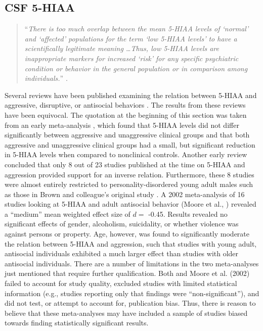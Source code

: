 \subsection{CSF 5-HIAA}
\begin{quotation}\noindent 
``\emph{There is too much overlap between the mean 5-HIAA levels of `normal' and `affected' populations for the term `low 5-HIAA levels' to have a scientifically legitimate meaning \ldots Thus, low 5-HIAA levels are inappropriate markers for increased `risk' for any specific psychiatric condition or behavior in the general population or in comparison among individuals.}'' 
\parencite[][29]{Balaban1996}.\end{quotation}


Several reviews have been published examining the relation between 5-HIAA and aggressive, disruptive, or antisocial behaviors \parencite[e.g.,][]{Asberg94, Balaban1996, Moore2002, Tuinier96, Tuinier95}. The results from these reviews have been equivocal. The quotation at the beginning of this section was taken from an early meta-analysis \parencite{Balaban1996}, which found that 5-HIAA levels did not differ significantly between aggressive and unaggressive clinical groups and that both aggressive and unaggressive clinical groups had a small, but significant reduction in 5-HIAA levels when compared to nonclinical controls. Another early review \parencite{Tuinier96} concluded that only 8 out of 23 studies published at the time on 5-HIAA and aggression provided support for an inverse relation. Furthermore, these 8 studies were almost entirely restricted to personality-disordered young adult males such as those in Brown and colleague's original study \parencite{Brown79}. A 2002 meta-analysis of 16 studies looking at 5-HIAA and adult antisocial behavior (Moore et al., \citeyear{Moore2002}) revealed a  ``medium'' \parencite[][p. 157]{Cohen88} mean weighted effect size of $d =$ -0.45. Results revealed no significant effects of gender, alcoholism, suicidality, or whether violence was against persons or property. Age, however, was found to significantly moderate the relation between 5-HIAA and aggression, such that studies with young adult, antisocial individuals exhibited a much larger effect than studies with older antisocial individuals. There are a number of limitations in the two meta-analyses just mentioned that require further qualification. Both \citeauthor{Balaban1996} and Moore et al. (2002) failed to account for study quality, excluded studies with limited statistical information (e.g., studies reporting only that findings were ``non-significant''), and did not test, or attempt to account for, publication bias. Thus, there is reason to believe that these meta-analyses may have included a sample of studies biased towards finding statistically significant results.


